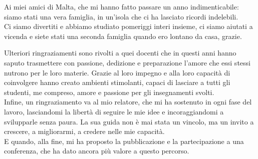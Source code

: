 Ai miei amici di Malta, che mi hanno fatto passare un anno indimenticabile: siamo stati una vera famiglia, in un’isola che ci ha lasciato ricordi indelebili.\\
 Ci siamo divertiti e abbiamo studiato pomeriggi interi insieme, ci siamo aiutati a vicenda e siete stati una seconda famiglia quando ero lontano da casa, grazie.

Ulteriori ringraziamenti sono rivolti a quei docenti che in questi anni hanno saputo trasmettere con passione, dedizione e preparazione
 l’amore che essi stessi nutrono per le loro materie. Grazie al loro impegno e alla loro capacità di coinvolgere hanno creato ambienti stimolanti,
  capaci di lasciare a tutti gli studenti, me compreso, amore e passione per gli insegnamenti svolti.\\

Infine, un ringraziamento va al mio relatore, che mi ha sostenuto in ogni fase del lavoro, lasciandomi la libertà di seguire le mie idee e 
incoraggiandomi a svilupparle senza paura. La sua guida non è mai stata un vincolo, ma un invito a crescere, a migliorarmi, a credere nelle mie capacità.\\
 E quando, alla fine, mi ha proposto la pubblicazione e la partecipazione a una conferenza, che ha dato ancora più valore a questo percorso.\\
